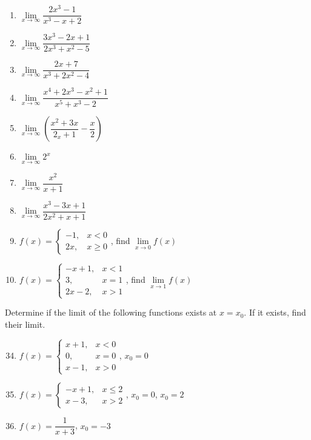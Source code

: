 \documentclass[12pt]{report}
\begin{document}
\begin{multicols}{2}
\begin{enumerate}
    \item $\lim\limits_{x\to\infty}{\dfrac{2x^{3}-1}{x^{3}-x+2}}$
    \item $\lim\limits_{x\to\infty}{\dfrac{3x^{3}-2x+1}{2x^{3}+x^{2}-5}}$
    \item $\lim\limits_{x\to\infty}{\dfrac{2x+7}{x^{3}+2x^{2}-4}}$
    \item $\lim\limits_{x\to\infty}{\dfrac{x^{4}+2x^{3}-x^{2}+1}{x^{5}+x^{3}-2}}$
    \item $\lim\limits_{x\to\infty}\left({\dfrac{x^{2}+3x}{2_x+1}}-{\dfrac{x}{2}}\right)$
    \item $\lim\limits_{x\to\infty}2^{x}$
    \item $\lim\limits_{x\to\infty}{\dfrac{x^{2}}{x+1}}$
    \item $\lim\limits_{x\to\infty}{\dfrac{x^{3}-3x+1}{2x^{2}+x+1}}$
    \item $f(x) = \left\{\begin{array}{rl}
              -1, & x < 0    \\
              2x, & x \geq 0
            \end{array}\right.$, find $\lim\limits_{x\to0}f(x)$
    \item $f(x) = \left\{\begin{array}{rl}
              -x+1,   & x < 1 \\
              3,      & x = 1 \\
              2x - 2, & x > 1
            \end{array}\right.$, find $\lim\limits_{x\to1}f(x)$
  \end{enumerate}
  Determine if the limit of the following functions exists at $x = x_0$. If it
  exists, find their limit.
  \begin{enumerate}
    \setcounter{enumi}{33}
    \item $f(x) = \left\{\begin{array}{rl}
              x+1, & x < 0 \\
              0,   & x = 0 \\
              x-1, & x > 0
            \end{array}\right.$, $x_0 = 0$

    \item $f(x) = \left\{\begin{array}{rl}
              -x + 1, & x \leq 2 \\
              x - 3,  & x > 2
            \end{array}\right.$, $x_0 = 0$, $x_0 = 2$

    \item $f(x) = \dfrac{1}{x+3}$, $x_0 = -3$
  \end{enumerate}
\end{multicols}
\end{document}
